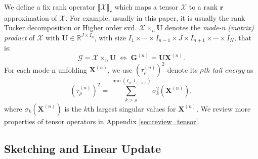 We define a fix rank operator $\llbracket \mathscr{X} \rrbracket_r$ which maps a tensor $\mathscr{X}$ to a rank $\mathbf{r}$ approximation of $\mathscr{X}$. For example, usually in this paper, it is usually the rank  Tucker decomposition or Higher order svd.
$\mathscr{X} \times_n \mathbf{U}$ denotes the \textit{mode-n (matrix) product} of $\mathscr{X}$ with $\mathbf{U} \in \mathbb{R}^{J \times I_n}$, with size $I_1 \times \cdots \times I_{n-1} \times J \times I_{n+1} \times \cdots \times I_N$, that is: 
\begin{equation}
\mathscr{G} = \mathscr{X} \times_n \mathbf{U} \; \iff \; \mathbf{G}^{(n)} = \mathbf{U}\mathbf{X}^{(n)}.
\end{equation}
For each mode-n unfolding $\mathbf{X}^{(n)}$, we use $(\tau_\rho^{(n)})^2$ denote its $\rho$\textit{th tail energy} as
\begin{equation}
(\tau_\rho^{(n)})^2 = \sum_{k>\rho}^{\min(I_n,I_{(-n)})} \sigma_{k}^2(\mathbf{X}^{(n)}), 
\end{equation}
where $\sigma_{k}(\mathbf{X}^{(n)})$ is the $k$th largest singular values for $\mathbf{X}^{(n)}$. We review more properties of tensor operators in Appendix \ref{sec:review_tensor}. 


\subsection{Sketching and Linear Update} 





